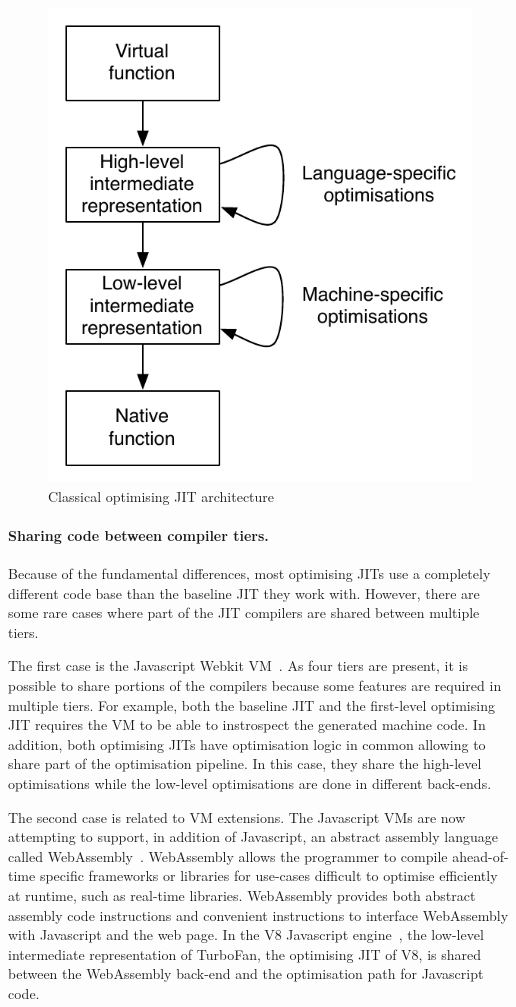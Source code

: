 \documentclass[a4paper,12pt,twoside]{../includes/ThesisStyle}
\begin{document}
\begin{figure}[h!]
    \begin{center}
        \includegraphics[width=0.49\linewidth]{OptJITFig}
        \caption{Classical optimising JIT architecture}
        \label{fig:OptJITFig}
    \end{center}
\end{figure}

\paragraph{Sharing code between compiler tiers.} Because of the fundamental differences, most optimising JITs use a completely different code base than the baseline JIT they work with. However, there are some rare cases where part of the JIT compilers are shared between multiple tiers. 

The first case is the Javascript Webkit VM~\cite{Webkit15}. As four tiers are present, it is possible to share portions of the compilers because some features are required in multiple tiers. For example, both the baseline JIT and the first-level optimising JIT requires the VM to be able to instrospect the generated machine code. In addition, both optimising JITs have optimisation logic in common allowing to share part of the optimisation pipeline. In this case, they share the high-level optimisations while the low-level optimisations are done in different back-ends.

The second case is related to VM extensions. The Javascript VMs are now attempting to support, in addition of Javascript, an abstract assembly language called WebAssembly~\cite{WebAssembly}. WebAssembly allows the programmer to compile ahead-of-time specific frameworks or libraries for use-cases difficult to optimise efficiently at runtime, such as real-time libraries. WebAssembly provides both abstract assembly code instructions and convenient instructions to interface WebAssembly with Javascript and the web page. In the V8 Javascript engine~\cite{V8}, the low-level intermediate representation of TurboFan, the optimising JIT of V8, is shared between the WebAssembly back-end and the optimisation path for Javascript code.
\end{document}
